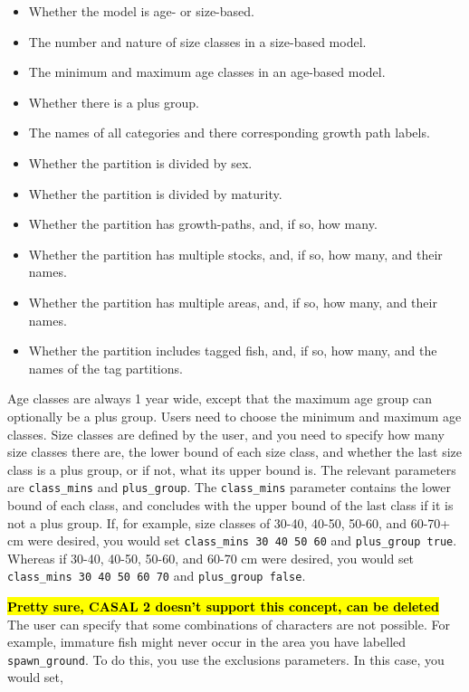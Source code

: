 \begin{itemize}
\item Whether the model is age- or size-based.
\item The number and nature of size classes in a size-based model.
\item	The minimum and maximum age classes in an age-based model.
\item	Whether there is a plus group.
\item 	The names of all categories and there corresponding growth path labels.
\item	Whether the partition is divided by sex.
\item	Whether the partition is divided by maturity.
\item	Whether the partition has growth-paths, and, if so, how many.
\item	Whether the partition has multiple stocks, and, if so, how many, and their names.
\item	Whether the partition has multiple areas, and, if so, how many, and their names.
\item	Whether the partition includes tagged fish, and, if so, how many, and the names of the tag partitions.
\end{itemize}

Age classes are always 1 year wide, except that the maximum age group can optionally be a plus group. Users need to choose the minimum and maximum age classes. Size classes are defined by the user, and you need to specify how many size classes there are, the lower bound of each size class, and whether the last size class is a plus group, or if not, what its upper bound is. The relevant parameters are \texttt{class\_mins} and \texttt{plus\_group}. The \texttt{class\_mins} parameter contains the lower bound of each class, and concludes with the upper bound of the last class if it is not a plus group. If, for example, size classes of 30-40, 40-50, 50-60, and 60-70+ cm were desired, you would set \texttt{class\_mins 30 40 50 60} and \texttt{plus\_group true}. Whereas if 30-40, 40-50, 50-60, and 60-70 cm were desired, you would set \texttt{class\_mins 30 40 50 60 70} and \texttt{plus\_group false}.

\hl{\textbf{Pretty sure, CASAL 2 doesn't support this concept, can be deleted}}\\
The user can specify that some combinations of characters are not possible. For example, immature fish might never occur in the area you have labelled \texttt{spawn\_ground}. To do this, you use the exclusions parameters. In this case, you would set,

